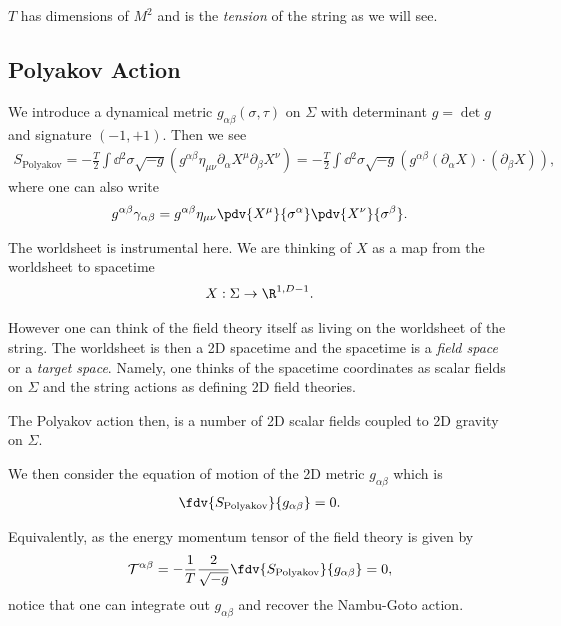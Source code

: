 $T$ has dimensions of $M^2$ and is the \emph{tension} of the string as we will see.

\subsection{Polyakov Action}

We introduce a dynamical metric $g_{\alpha \beta}\left( \sigma, \tau \right) $ on $\Sigma$ with determinant $g = \det g$ and signature $\left( -1,+1\right) $. Then we see
\begin{align}
    S_{\text{Polyakov}} = -\frac{T}{2} \int \dd{^2\sigma} \sqrt{-g} \left( g^{\alpha \beta} \eta_{\mu \nu}\partial_\alpha X^{\mu} \partial_\beta X^{\nu} \right)   = -\frac{T}{2} \int \dd{^2\sigma} \sqrt{-g} \left( g^{\alpha \beta} \left( \partial_\alpha X \right) \cdot  \left(  \partial_\beta X \right)  \right)
,\end{align}
where one can also write
\begin{align}
    g^{\alpha \beta} \gamma_{\alpha \beta} = g^{\alpha \beta} \eta_{\mu \nu}  \pdv{X^{\mu}}{\sigma^{\alpha}} \pdv{X^{\nu}}{\sigma^{\beta}}
.\end{align}

\begin{note}
    The worldsheet is instrumental here. We are thinking of $X$ as a map from the worldsheet to spacetime
    \begin{align}
        X : \Sigma \to \R^{1, D - 1}
    .\end{align}

    However one can think of the field theory itself as living on the worldsheet of the string. The worldsheet is then a 2D spacetime and the spacetime is a \textit{field space} or a \textit{target space}. Namely, one thinks of the spacetime coordinates as scalar fields on $\Sigma$ and the string actions as defining 2D field theories.

    The Polyakov action then, is a number of 2D scalar fields coupled to 2D gravity on $\Sigma$.
\end{note}

We then consider the equation of motion of the 2D metric $g_{\alpha \beta}$ which is
\begin{align}
    \fdv{S_\text{Polyakov}}{g_{\alpha \beta}} = 0
.\end{align}

Equivalently, as the energy momentum tensor of the field theory is given by
\begin{align}
    \mathcal{T}^{\alpha \beta} = -\frac{1}{T}\frac{2}{\sqrt{-g} } \fdv{S_\text{Polyakov}}{g_{\alpha \beta}} = 0
,\end{align}
notice that one can integrate out $g_{\alpha \beta}$ and recover the Nambu-Goto action.









